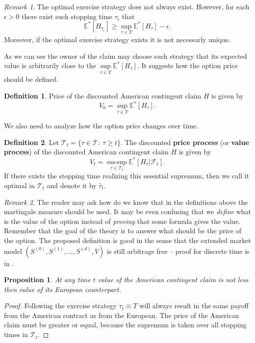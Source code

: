\documentclass[a4paper,11pt, twoside]{book}
\newtheorem{prop}[thm]{Proposition}
\theoremstyle{definition}
\newtheorem{mydef}{Definition}[chapter]
\theoremstyle{remark}
\newtheorem{remark}{Remark}[chapter]
\def\Em{{\mathbb{E}^*}}
\DeclareMathOperator*{\esssup}{ess\,sup}
\begin{document}
\begin{remark}
 The optimal exercise strategy does not always exist. However, for each $\epsilon > 0$ there exist such stopping time $\tau_\epsilon$ that
 \[ \Em[H_{\tau_\epsilon}] \geq \sup\limits_{\tau \in T} \Em[H_{\tau}] - \epsilon.\]
 Moreover, if the optimal exercise strategy exists it is not necessarly unique.
\end{remark}
As we can see the owner of the claim may choose such strategy that its expected value is arbitrarily close to the $\sup\limits_{\tau \in T} \Em[H_{\tau}]$. It suggests how the option price should be defined.
\begin{mydef}
 Price of the discounted American contingent claim $H$ is given by
\begin{equation}
\label{eq:AM_optPrice}
V_0 = \sup\limits_{\tau \in T} \Em[H_{\tau}]. 
\end{equation}
\end{mydef}
We also need to analyze how the option price changes over time.
\begin{mydef}
 \label{def:valueProcess}
 Let  $\mathcal{T}_t = \{ \tau \in \mathcal{T}:\ \tau \geq t \}$. The discounted \textbf{price process} (or \textbf{value process}) of the  discounted American contingent claim $H$ is given by
\begin{equation}
\label{eq:AM_valueProcess}
V_t = \esssup\limits_{\tau \in  \mathcal{T}_t} \Em[H_{\tau} | \mathcal{F}_t]. 
\end{equation}
 If there exists the stopping time realizing this essential supremum, then we call it optimal in $\mathcal{T}_t$ and denote it by $\hat{\tau}_t$.
\end{mydef}

\begin{remark}
 The reader may ask how do we know that in the definitions above the martingale measure should be used. It may be even confusing that we \emph{define} what is the value of the option instead of \emph{proving} that some formula gives the value. Remember that the goal of the theory is to answer what should be the price of the option. The proposed definition is good in the sense that the extended market model $(S^{(0)}, S^{(1)}, \ldots, S^{(d)}, V)$ is still arbitrage free -- proof for discrete time is in \cite{follmer}.
\end{remark}


\begin{prop}
 At any time $t$ value of the American contingent claim is not less then value of its European counterpart.
\end{prop}
\begin{proof}
 Following the exercise strategy $\tau_t \equiv T$ will always result in the same payoff from the American contract as from the European. The price of the American claim must be greater or equal, because the supremum is taken over all stopping times in $\mathcal{T}_t$.
\end{proof}
\end{document}
